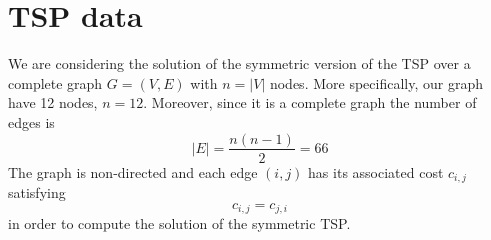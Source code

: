 \documentclass[12pt]{article}
\begin{document}
\section{TSP data}
We are considering the solution of the symmetric version of the TSP over a complete graph $G=(V,E)$ with $n = |V|$ nodes. More specifically, our graph have 12 nodes, $n=12$. Moreover, since it is a complete graph the number of edges is
\begin{equation}
    |E| = \frac{n(n-1)}{2} = 66
\end{equation}
The graph is non-directed and each edge $(i,j)$ has its associated cost $c_{i,j}$ satisfying 
\begin{equation}
    c_{i,j} = c_{j,i}
\end{equation}
in order to compute the solution of the symmetric TSP.\\
\end{document}
